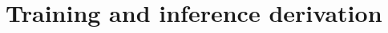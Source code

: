 \documentclass{article} %
\newcommand{\lossclamp}{22}
\newcommand{\lossnorm}{7.43}
\begin{document}
%
%
%
%

\section{Training and inference derivation}
\label{app:training-inference}
\end{document}
